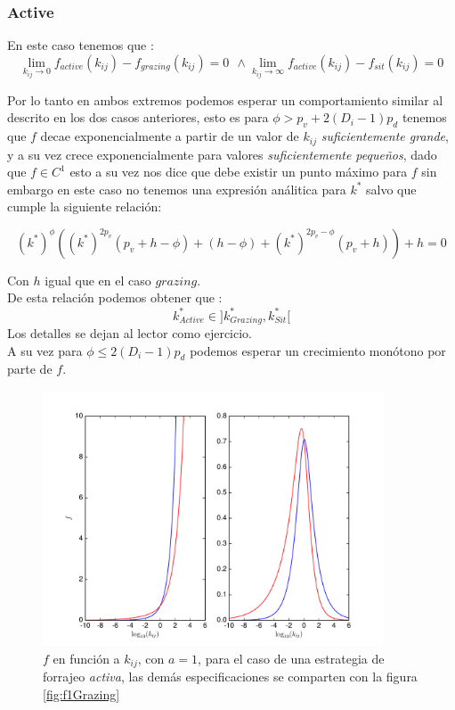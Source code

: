 \subsubsection{Active}

En este caso tenemos que :
\begin{equation}
  \lim_{k_{ij} \to 0 } f_{active}(k_{ij}) - f_{grazing}(k_{ij}) = 0 \ \ \land \lim_{k_{ij} \to \infty}f_{active}(k_{ij}) - f_{sit}(k_{ij}) = 0
\end{equation}

Por lo tanto en ambos extremos podemos esperar un comportamiento similar al descrito en los dos casos anteriores, esto es para $\phi > p_v + 2(D_i -1) p_d$ tenemos que $f$ decae exponencialmente a partir de un valor de $k_{ij}$ \emph{suficientemente grande}, y a su vez crece exponencialmente para valores \emph{suficientemente peque\~nos}, dado que $f \in C^1$ esto a su vez nos dice que debe existir un punto m\'aximo para $f$ sin embargo en este caso no tenemos una expresi\'on an\'alitica para $k^*$ salvo que cumple la siguiente relaci\'on:

\begin{equation}
  (k^*)^{\phi}((k^*)^{2p_v}(p_v+ h -\phi) + (h -\phi) + (k^*)^{2p_v - \phi}(p_v + h ) ) + h = 0
\end{equation}

Con $h$ igual que en el caso $grazing$.\\
De esta relaci\'on podemos obtener que :
\begin{equation}
  k^*_{Active} \in ] k^*_{Grazing} , k^*_{Sit} [
\end{equation}
Los detalles se dejan al lector como ejercicio.\\

A su vez para $\phi \leq 2(D_i - 1)p_d $ podemos esperar un crecimiento mon\'otono por parte de $f$. 

\begin{figure}
\begin{center}
 \includegraphics[width=0.9\textwidth]{./Plots/f1Active.pdf}
 \caption[$f_1, Active$]{$f$ en funci\'on a $k_{ij}$, con $a =1$, para el caso de una estrategia de forrajeo \emph{activa}, las dem\'as especificaciones se comparten con la figura \ref{fig:f1Grazing}}
 \label{fig:f1Active} 
\end{center}
\end{figure}

